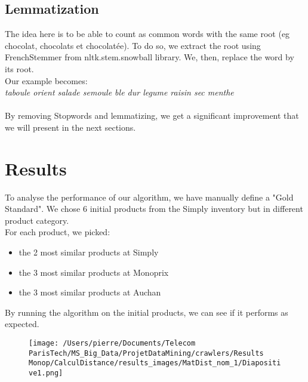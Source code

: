 \documentclass{article}
\begin{document}
	\subsection{Lemmatization}

The idea here is to be able to count as common words with the same root (eg chocolat, chocolats et chocolatée). To do so, we extract the root using FrenchStemmer  from nltk.stem.snowball library. We, then, replace the word by its root.
\\
Our example becomes:
\\
\textit{taboule orient salade semoule ble dur legume raisin sec menthe}
\\
\\
By removing Stopwords and lemmatizing, we get a significant improvement that we will present in the next sections.

 
\section{Results}
To analyse the performance of our algorithm, we have manually define a "Gold Standard".
We chose 6 initial products from the Simply inventory but in different product category.
\\
 For each product, we picked:
\begin{itemize} 
\item the 2 most similar products at Simply
\item the 3 most similar products at Monoprix
\item the 3 most similar products at Auchan
\end{itemize}

By running the algorithm on the initial products, we can see if it performs as expected.

\begin{figure}[!h]
\texttt{[image: /Users/pierre/Documents/Telecom ParisTech/MS\_Big\_Data/ProjetDataMining/crawlers/Results Monop/CalculDistance/results\_images/MatDist\_nom\_1/Diapositive1.png]}
\end{figure}


    
    
    
    
\end{document}
